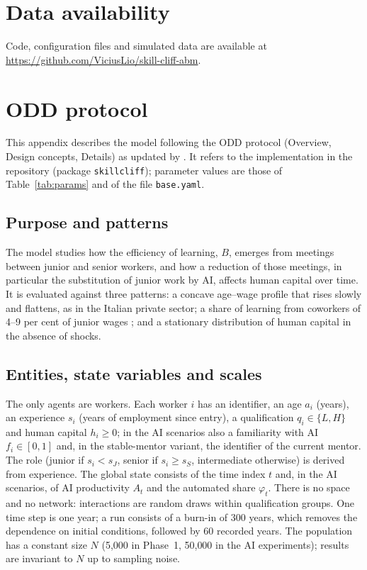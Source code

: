 \documentclass[preprint,12pt,authoryear]{elsarticle}
\begin{document}
\section*{Data availability}
Code, configuration files and simulated data are available at \url{https://github.com/ViciusLio/skill-cliff-abm}.

\appendix
\section{ODD protocol}\label{app:odd}

This appendix describes the model following the ODD protocol (Overview, Design concepts, Details) as updated by \citet{Grimm2020}. It refers to the implementation in the repository (package \texttt{skillcliff}); parameter values are those of Table~\ref{tab:params} and of the file \texttt{base.yaml}.

\subsection{Purpose and patterns}
The model studies how the efficiency of learning, $B$, emerges from meetings between junior and senior workers, and how a reduction of those meetings, in particular the substitution of junior work by AI, affects human capital over time. It is evaluated against three patterns: a concave age--wage profile that rises slowly and flattens, as in the Italian private sector; a share of learning from coworkers of 4--9 per cent of junior wages \citep{Jarosch2021}; and a stationary distribution of human capital in the absence of shocks.

\subsection{Entities, state variables and scales}
The only agents are workers. Each worker $i$ has an identifier, an age $a_i$ (years), an experience $s_i$ (years of employment since entry), a qualification $q_i\in\{L,H\}$ and human capital $h_i\ge 0$; in the AI scenarios also a familiarity with AI $f_i\in[0,1]$ and, in the stable-mentor variant, the identifier of the current mentor. The role (junior if $s_i<s_J$, senior if $s_i\ge s_S$, intermediate otherwise) is derived from experience. The global state consists of the time index $t$ and, in the AI scenarios, of AI productivity $A_t$ and the automated share $\varphi_t$. There is no space and no network: interactions are random draws within qualification groups. One time step is one year; a run consists of a burn-in of 300 years, which removes the dependence on initial conditions, followed by 60 recorded years. The population has a constant size $N$ (5{,}000 in Phase~1, 50{,}000 in the AI experiments); results are invariant to $N$ up to sampling noise.
\end{document}
